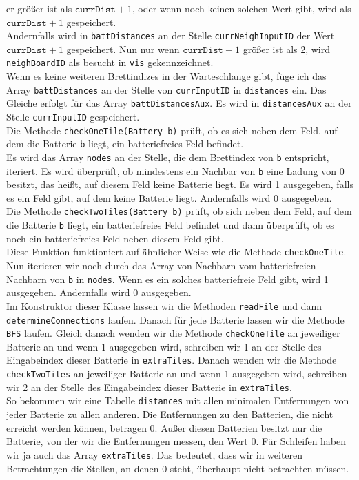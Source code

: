 \documentclass[a4paper,10pt,ngerman]{scrartcl}
\begin{document}
er größer ist als $\texttt{currDist} + 1$, oder wenn noch keinen solchen Wert gibt, wird als $\texttt{currDist} + 1$
gespeichert.\\
Andernfalls wird in \texttt{battDistances} an der Stelle \texttt{currNeighInputID} der Wert $\texttt{currDist} + 1$ gespeichert.
Nun nur wenn $\texttt{currDist} + 1$ größer ist als 2, wird \texttt{neighBoardID} als besucht in \texttt{vis} gekennzeichnet.\\
Wenn es keine weiteren Brettindizes in der Warteschlange gibt, füge ich das Array \texttt{battDistances}
an der Stelle von \texttt{currInputID} in \texttt{distances} ein.
Das Gleiche erfolgt für das Array \texttt{battDistancesAux}. Es wird in \texttt{distancesAux} an der Stelle
\texttt{currInputID} gespeichert.\\

Die Methode \texttt{checkOneTile(Battery b)} prüft, ob es sich neben dem Feld, auf dem die Batterie \texttt{b}
liegt, ein batteriefreies Feld befindet.\\
Es wird das Array \texttt{nodes} an der Stelle, die dem Brettindex von \texttt{b} entspricht, iteriert.
Es wird überprüft, ob mindestens ein Nachbar von \texttt{b} eine Ladung von 0 besitzt, das heißt, auf
diesem Feld keine Batterie liegt. Es wird 1 ausgegeben, falls es ein Feld gibt, auf dem keine Batterie liegt.
Andernfalls wird 0 ausgegeben.\\

Die Methode \texttt{checkTwoTiles(Battery b)} prüft, ob sich neben dem Feld, auf dem die Batterie \texttt{b}
liegt, ein batteriefreies Feld befindet und dann überprüft, ob es noch ein batteriefreies Feld neben diesem
Feld gibt.\\
Diese Funktion funktioniert auf ähnlicher Weise wie die Methode \texttt{checkOneTile}.
Nun iterieren wir noch durch das Array von Nachbarn vom batteriefreien Nachbarn von \texttt{b} in \texttt{nodes}.
Wenn es ein solches batteriefreie Feld gibt, wird 1 ausgegeben. Andernfalls wird 0 ausgegeben.\\

Im Konstruktor dieser Klasse lassen wir die Methoden \texttt{readFile} und dann \texttt{determineConnections}
laufen. Danach für jede Batterie lassen wir die Methode \texttt{BFS} laufen.
Gleich danach wenden wir die Methode \texttt{checkOneTile} an jeweiliger Batterie an und wenn
1 ausgegeben wird, schreiben wir 1 an der Stelle des Eingabeindex dieser Batterie in \texttt{extraTiles}.
Danach wenden wir die Methode \texttt{checkTwoTiles} an jeweiliger Batterie an und wenn
1 ausgegeben wird, schreiben wir 2 an der Stelle des Eingabeindex dieser Batterie in \texttt{extraTiles}.\\
So bekommen wir eine Tabelle \texttt{distances} mit allen minimalen Entfernungen von
jeder Batterie zu allen anderen. Die Entfernungen zu den Batterien, die nicht erreicht werden können, betragen 0.
Außer diesen Batterien besitzt nur die Batterie, von der wir die Entfernungen messen, den Wert 0.
Für Schleifen haben wir ja auch das Array \texttt{extraTiles}. Das bedeutet, dass wir in weiteren Betrachtungen
die Stellen, an denen 0 steht, überhaupt nicht betrachten müssen.
\end{document}
